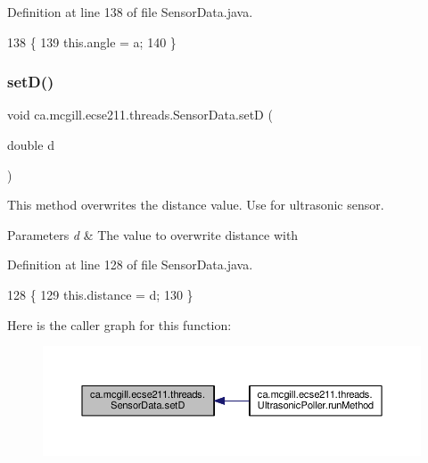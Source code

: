 Definition at line 138 of file Sensor\+Data.\+java.


\begin{DoxyCode}
138                              \{
139       this.angle = a;
140   \}
\end{DoxyCode}
\mbox{\label{classca_1_1mcgill_1_1ecse211_1_1threads_1_1_sensor_data_a2c1f8e625478b89aabe6e9911e482ef3}} 
\subsubsection{\texorpdfstring{set\+D()}{setD()}}
{\footnotesize\ttfamily void ca.\+mcgill.\+ecse211.\+threads.\+Sensor\+Data.\+setD (\begin{DoxyParamCaption}\item[{double}]{d }\end{DoxyParamCaption})}

This method overwrites the distance value. Use for ultrasonic sensor.


\begin{DoxyParams}{Parameters}
{\em d} & The value to overwrite distance with \\
\hline
\end{DoxyParams}


Definition at line 128 of file Sensor\+Data.\+java.


\begin{DoxyCode}
128                              \{
129       this.distance = d;
130   \}
\end{DoxyCode}
Here is the caller graph for this function\+:
\nopagebreak
\begin{figure}[H]
\begin{center}
\leavevmode
\includegraphics[width=350pt]{classca_1_1mcgill_1_1ecse211_1_1threads_1_1_sensor_data_a2c1f8e625478b89aabe6e9911e482ef3_icgraph}
\end{center}
\end{figure}
\mbox{\label{classca_1_1mcgill_1_1ecse211_1_1threads_1_1_sensor_data_af905a6f2825716ae1a39bf7f6be09477}} 

